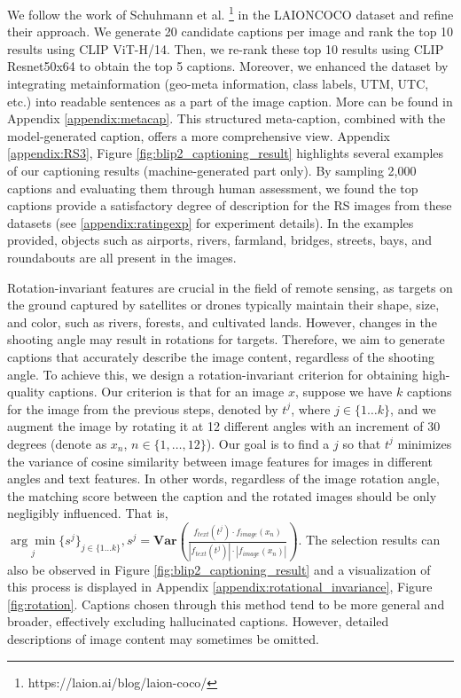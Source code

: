 \documentclass[journal]{IEEEtran}
\begin{document}
We follow the work of Schuhmann et al. \footnote{https://laion.ai/blog/laion-coco/} in the LAIONCOCO dataset and refine their approach. We generate 20 candidate captions per image and rank the top 10 results using CLIP ViT-H/14. Then, we re-rank these top 10 results using CLIP Resnet50x64 to obtain the top 5 captions. Moreover, we enhanced the dataset by integrating metainformation (geo-meta information, class labels, UTM, UTC, etc.) into readable sentences as a part of the image caption. More can be found in Appendix \ref{appendix:metacap}. This structured meta-caption, combined with the model-generated caption, offers a more comprehensive view. Appendix \ref{appendix:RS3}, Figure \ref{fig:blip2_captioning_result} highlights several examples of our captioning results (machine-generated part only). By sampling 2,000 captions and evaluating them through human assessment, we found the top captions provide a satisfactory degree of description for the RS images from these datasets (see \ref{appendix:ratingexp} for experiment details). In the examples provided, objects such as airports, rivers, farmland, bridges, streets, bays, and roundabouts are all present in the images. 

Rotation-invariant features are crucial in the field of remote sensing, as targets on the ground captured by satellites or drones typically maintain their shape, size, and color, such as rivers, forests, and cultivated lands. However, changes in the shooting angle may result in rotations for targets. Therefore, we aim to generate captions that accurately describe the image content, regardless of the shooting angle. To achieve this, we design a rotation-invariant criterion for obtaining high-quality captions. Our criterion is that for an image $x$, suppose we have $k$ captions for the image from the previous steps, denoted by $t^j$, where $j \in \{1\dots k\}$, and we augment the image by rotating it at 12 different angles with an increment of 30 degrees (denote as  ${x_n}$, $n \in \{1, \dots, 12\}$). Our goal is to find a $j$ so that $t^j$ minimizes the variance of cosine similarity between image features for images in different angles and text features. In other words, regardless of the image rotation angle, the matching score between the caption and the rotated images should be only negligibly influenced. That is, $\underset{j}{\arg\min} \{s^j\}_{j \in \{1 \dots k\}}, s^j =\textbf{Var}(\frac{f_{text}{(t^j)} \cdot f_{image}{(x_n)}}{|f_{text}{(t^j)}| \cdot |f_{image}{(x_n)}| })$.  The selection results can also be observed in Figure \ref{fig:blip2_captioning_result} and a visualization of this process is displayed in Appendix \ref{appendix:rotational_invariance}, Figure \ref{fig:rotation}. Captions chosen through this method tend to be more general and broader, effectively excluding hallucinated captions. However, detailed descriptions of image content may sometimes be omitted.
\end{document}
